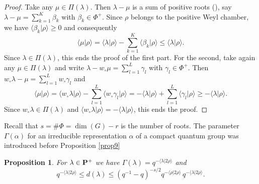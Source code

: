 \documentclass[11 pt, leqno]{amsart}
\newcommand{\la}{\langle}
\newcommand{\ra}{\rangle}
\newtheorem{proposition}[theorem]{Proposition}
\theoremstyle{definition}
\numberwithin{equation}{section}
\begin{document}
\begin{proof}
Take any $\mu\in \Pi(\lambda)$. Then $\lambda-\mu$ is a sum of positive roots (\cite[Proposition 21.3]{Humphreys}), say $\lambda-\mu=\sum_{k=1}^{K} \beta_k$ with $\beta_k\in \Phi^+$. Since $\rho$ belongs to the positive Weyl chamber, we have $\la\beta_k|\rho\ra\ge 0$ and consequently
\[
\la \mu |\rho\ra =
\la \lambda|\rho\ra - \sum_{k=1}^{K} \la \beta_k |\rho \ra \le 
\la \lambda|\rho\ra.
\]
Since $\lambda\in\Pi(\lambda)$, this ends the proof of the first part. For the second, take again any $\mu\in \Pi(\lambda)$ and write $\lambda-w_\circ \mu=\sum_{l=1}^{L}\gamma_l$ with $\gamma_l\in \Phi^+$. Then $w_\circ\lambda- \mu=\sum_{l=1}^{L}w_\circ \gamma_l$ and
\[
\la \mu|\rho\ra= \la 
w_\circ\lambda |\rho\ra - \sum_{l=1}^{L} 
\la w_\circ\gamma_l|\rho\ra=
-\la 
\lambda |\rho\ra + \sum_{l=1}^{L} 
\la\gamma_l|\rho\ra\ge -\la \lambda|\rho\ra.
\]
Since $w_\circ\lambda\in \Pi(\lambda)$ and $\la w_\circ\lambda|\rho\ra=-\la\lambda|\rho\ra$, this ends the proof.
\end{proof}

Recall that $s=\#\Phi=\dim(G)-r$ is the number of roots. The parameter $\Gamma(\alpha)$ for an irreducible representation $\alpha$ of a compact quantum group was introduced before Proposition \ref{prop9}

\begin{proposition}\label{prop5}
For $\lambda\in \bf{P}^+$ we have $\Gamma(\lambda)=q^{-\la \lambda |2\rho\ra}$ and
\[
q^{-\la \lambda|2 \rho\ra }\le 
d(\lambda)\le 
(q^{-1}-q)^{-s/2} q^{-\la \rho|2 \rho\ra } \,
q^{- \la \lambda|2 \rho\ra }.
\]
\end{proposition}
\end{document}
